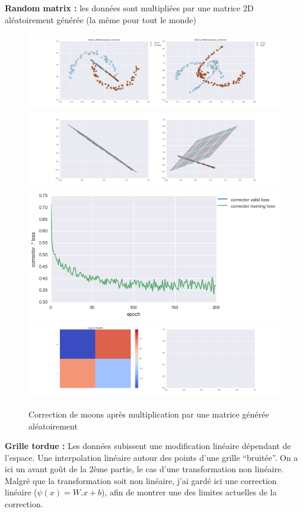 {\Large \textbf{Random matrix :}} les données sont multipliées par une matrice 2D aléatoirement générée
 (la même pour tout le monde)

\begin{figure}[H] %
\centering
\includegraphics[width=\linewidth]{fig/24-05-2016/moons/Moons_RMatClasswise_Corrector-DATA.png}
\includegraphics[width=\linewidth]{fig/24-05-2016/moons/Moons_RMatClasswise_Corrector-GridCheck.png}
\includegraphics[width=0.45\linewidth]{fig/24-05-2016/moons/Moons_RMatClasswise_Corrector-Learning_curve.png}
\includegraphics[width=\linewidth]{fig/24-05-2016/moons/Moons_RMatClasswise_Corrector-W.png}
\caption{Correction de moons après multiplication par une matrice générée aléatoirement}
\label{fig:recap-moons-RMat-classwise}
\end{figure}


{\Large \textbf{Grille tordue :}} Les données subissent une modification linéaire dépendant de l'espace.
Une interpolation linéaire autour des points d'une grille ``bruitée''.
On a ici un avant goût de la 2ème partie, le cas d'une transformation non linéaire.
Malgré que la transformation soit non linéaire, j'ai gardé ici une correction linéaire ($\psi(x) = W.x+b$),
afin de montrer une des limites actuelles de la correction.

